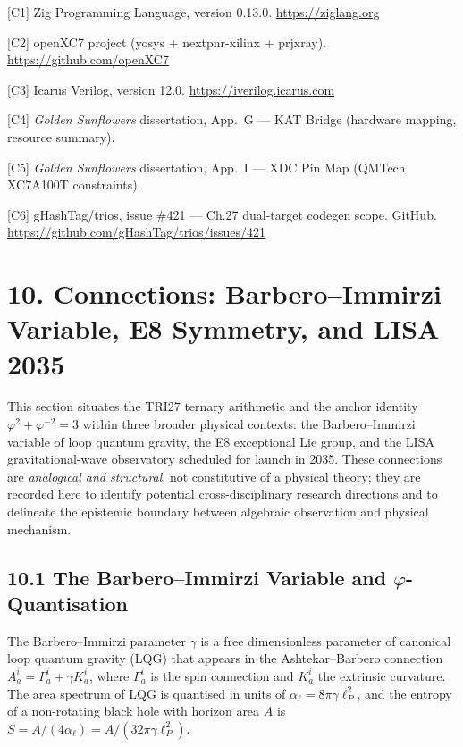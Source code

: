 [C1] Zig Programming Language, version 0.13.0.
\url{https://ziglang.org}

[C2] openXC7 project (yosys + nextpnr-xilinx +
prjxray). \url{https://github.com/openXC7}

[C3] Icarus Verilog, version 12.0.
\url{https://iverilog.icarus.com}

[C4] \emph{Golden Sunflowers} dissertation,
App.~G --- KAT Bridge (hardware mapping, resource
summary).

[C5] \emph{Golden Sunflowers} dissertation,
App.~I --- XDC Pin Map (QMTech XC7A100T
constraints).

[C6] gHashTag/trios, issue \#421 --- Ch.27
dual-target codegen scope. GitHub.
\url{https://github.com/gHashTag/trios/issues/421}

\section{10. Connections: Barbero--Immirzi Variable, E8 Symmetry, and
LISA 2035}\label{fa_27:sec:connections}

This section situates the TRI27 ternary arithmetic and the anchor
identity $\varphi^2 + \varphi^{-2} = 3$ within three broader physical
contexts: the Barbero--Immirzi variable of loop quantum gravity, the E8
exceptional Lie group, and the LISA gravitational-wave observatory
scheduled for launch in 2035. These connections are \emph{analogical and
structural}, not constitutive of a physical theory; they are recorded
here to identify potential cross-disciplinary research directions and to
delineate the epistemic boundary between algebraic observation and
physical mechanism.

\subsection{10.1 The Barbero--Immirzi Variable and
$\varphi$-Quantisation}\label{fa_27:sec:barbero-immirzi}

The Barbero--Immirzi parameter $\gamma$ is a free dimensionless
parameter of canonical loop quantum gravity (LQG) that appears in the
Ashtekar--Barbero connection
$A_a^i = \Gamma_a^i + \gamma K_a^i$, where $\Gamma_a^i$ is the spin
connection and $K_a^i$ the extrinsic curvature. The area spectrum of
LQG is quantised in units of
$\alpha_\ell = 8\pi\gamma\ell_P^2$, and the entropy of a
non-rotating black hole with horizon area $A$ is
$S = A/(4\alpha_\ell) = A/(32\pi\gamma\ell_P^2)$.


